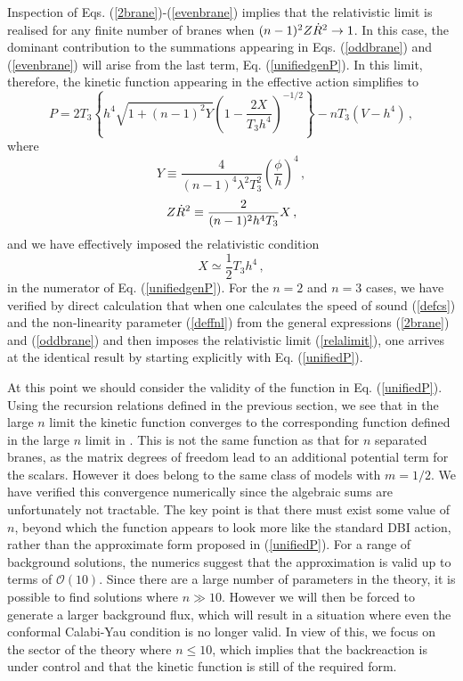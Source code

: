 Inspection of Eqs. (\ref{2brane})-(\ref{evenbrane}) implies that 
the relativistic limit is realised for any finite number of branes when 
$(n-1)^2 Z\dot{R}^2 \rightarrow 1$. In this case, the dominant contribution 
to the summations appearing in Eqs. (\ref{oddbrane}) and (\ref{evenbrane})
will arise from the last term, Eq. (\ref{unifiedgenP}). In this limit, 
therefore, the kinetic function appearing in the effective action simplifies to 
\begin{equation}
\label{unifiedP}
P = 2T_3 \left\{ h^4 \sqrt{1+(n-1)^2Y} 
\left( 1- \frac{2X}{T_3h^4} \right)^{-1/2} 
 \right\} - n T_3 \left(V - h^4 \right) \,,
\end{equation}
where 
\begin{equation}
\label{defY}
Y \equiv \frac{4}{(n-1)^4 \lambda^2 T_3^2} \left( \frac{\phi}{h} \right)^4 \,,
\end{equation}
\begin{equation}\label{defXR2}
Z\dot{R}^2 \equiv \frac{2}{(n-1)^2 h^4 T_3}X \,,
\end{equation} 
and we have effectively imposed the relativistic condition 
\begin{equation}
\label{relalimit}
X \simeq \frac{1}{2} T_3 h^4 \,,
\end{equation}
in the numerator of Eq. (\ref{unifiedgenP}).  
For the $n=2$ and $n=3$ cases, we have verified by direct 
calculation that when one calculates the speed of sound 
(\ref{defcs}) and the non-linearity parameter 
(\ref{deffnl}) from the general expressions (\ref{2brane}) and (\ref{oddbrane}) 
and then imposes the relativistic
limit (\ref{relalimit}), one arrives at the identical result 
by starting explicitly with Eq. (\ref{unifiedP}).

At this point we should consider the validity of 
the function in Eq. (\ref{unifiedP}). Using the
recursion relations defined in the previous section, 
we see that in the large $n$ limit the kinetic function converges to 
the corresponding function defined in the large $n$ 
limit in \cite{thomasward}. This is not the same function as that for
$n$ separated branes, as the matrix degrees of freedom 
lead to an additional potential term for the scalars. However it does belong
to the same class of models with $m=1/2$. We have 
verified this convergence numerically since the algebraic sums are
unfortunately not tractable. The key point is that there must exist some 
value of $n$, beyond which the function appears to look
more like the standard DBI action, rather than the 
approximate form proposed in (\ref{unifiedP}). For a range of background 
solutions, the numerics suggest that the approximation is 
valid up to terms of $\mathcal{O}(10)$. Since there are a large number of 
parameters in the theory, it is possible to find solutions 
where $n \gg 10$. However we will then be forced to 
generate a larger background flux, which will result 
in a situation where even the conformal 
Calabi-Yau condition is no longer valid. In view of this, we focus on
the sector of the theory where $n \le 10$, which implies that the 
backreaction is under control and that the kinetic function
is still of the required form. 


